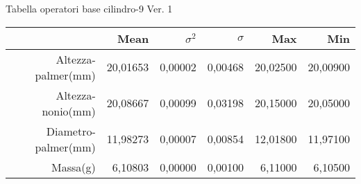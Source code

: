\documentclass[11pt,a4paper,oneside,openany3] {report}
\begin{document}
\newpage
Tabella operatori base cilindro-9 Ver. 1
\begin{table}[ht]
\centering
\begin{tabular}{rrrrrr}
  \hline
 & Mean & $\sigma^2$ & $\sigma$ & Max & Min \\ 
  \hline
Altezza-palmer(mm) & 20,01653 & 0,00002 & 0,00468 & 20,02500 & 20,00900 \\
  Altezza-nonio(mm) & 20,08667 & 0,00099 & 0,03198 & 20,15000 & 20,05000 \\ 
  Diametro-palmer(mm) & 11,98273 & 0,00007 & 0,00854 & 12,01800 & 11,97100 \\ 
  Massa(g)  & 6,10803 & 0,00000 & 0,00100 & 6,11000 & 6,10500 \\ 
   \hline
\end{tabular}
\end{table}
\end{document}
